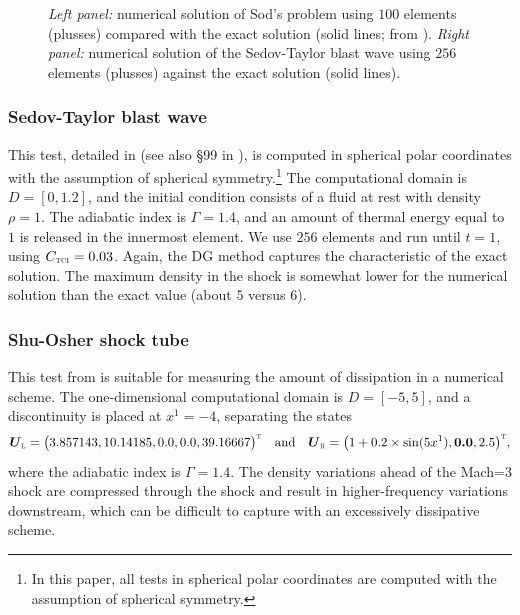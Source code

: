 \documentclass[letterpaper]{jpconf}
\newcommand{\vect}[1]{\boldsymbol{#1}}
\newcommand{\trans}{\textnormal{\tiny\textsc{T}}}
\newcommand{\leftState}{\textnormal{\tiny\textsc{L}}}
\newcommand{\rightState}{\textnormal{\tiny\textsc{R}}}
\newcommand{\TCI}{\textnormal{\tiny\textsc{TCI}}}
\begin{document}
\begin{figure}[h]
\begin{minipage}{18pc}
  \end{minipage}
  \caption{\label{fig:SodSedov}{\it Left panel:} numerical solution of Sod's problem using $100$ elements (plusses) compared with the exact solution (solid lines; from \cite{toro_1999}).  {\it Right panel:} numerical solution of the Sedov-Taylor blast wave using $256$ elements (plusses) against the exact solution (solid lines).}
\end{figure}

\subsubsection{Sedov-Taylor blast wave}

This test, detailed in \cite{sedov_1959} (see also {\S}99 in \cite{landauLifshitz_1979}), is computed in spherical polar coordinates with the assumption of spherical symmetry.\footnote{In this paper, all tests in spherical polar coordinates are computed with the assumption of spherical symmetry.}
The computational domain is $D=[0,1.2]$, and the initial condition consists of a fluid at rest with density $\rho=1$.  
The adiabatic index is $\Gamma=1.4$, and an amount of thermal energy equal to $1$ is released in the innermost element.  
We use $256$ elements and run until $t=1$, using $C_{\TCI}=0.03$.  
Again, the DG method captures the characteristic of the exact solution.  
The maximum density in the shock is somewhat lower for the numerical solution than the exact value (about $5$ versus $6$).  

\subsubsection{Shu-Osher shock tube}

This test from \cite{shuOsher_1989} is suitable for measuring the amount of dissipation in a numerical scheme.  
The one-dimensional computational domain is $D=[-5,5]$, and a discontinuity is placed at $x^{1}=-4$, separating the states
\begin{equation*}
  \vect{U}_{\leftState}=\big( 3.857143, 10.14185, 0.0, 0.0, 39.16667 \big)^{\trans}\quad\text{and}\quad
  \vect{U}_{\rightState}=\big( 1+0.2\times\sin(5 x^{1}), \vect{0.0}, 2.5 \big)^{\trans},
\end{equation*}
where the adiabatic index is $\Gamma=1.4$.  
The density variations ahead of the Mach=3 shock are compressed through the shock and result in higher-frequency variations downstream, which can be difficult to capture with an excessively dissipative scheme.  
\end{document}
